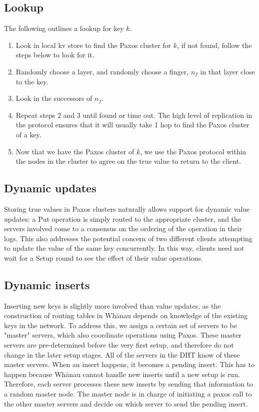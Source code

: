\documentclass[letter]{article}
\begin{document}
\subsection{Lookup}
The following outlines a lookup for key $k$.
\begin{enumerate}
\item Look in local kv store to find the Paxos cluster for $k$, if not found, follow the steps below to look for it.
\item Randomly choose a layer, and randomly choose a finger, $n_{f}$ in that layer close to the key.
\item Look in the successors of $n_{f}$.
\item Repeat steps 2 and 3 until found or time out. The high level of replication in the protocol ensures that it will usually take 1 hop to find the Paxos cluster of a key.
\item Now that we have the Paxos cluster of $k$, we use the Paxos protocol within the nodes in the cluster to agree on the true value to return to the client.


\end{enumerate}

\subsection{Dynamic updates}

Storing true values in Paxos clusters naturally allows support for dynamic value
updates: a Put operation is simply routed to the appropriate cluster, and the
servers involved come to a consensus on the ordering of the operation in their
logs. This also addresses the potential concern of two different clients
attempting to update the value of the same key concurrently. In this way,
clients need not wait for a Setup round to see the effect of their value
operations.

\subsection{Dynamic inserts}

Inserting new keys is slightly more involved than value updates, as the
construction of routing tables in Wh\={a}nau depends on knowledge of the existing
keys in the network. To address this, we assign a certain set of servers to be
"master" servers, which also coordinate operations using Paxos. These master servers
are pre-determined before the very first setup, and therefore do not change in the
later setup stages. All of the servers in the DHT know of these master servers. When
an insert happens, it becomes a pending insert. This has to happen because Wh\={a}nau
cannot handle new inserts until a new setup is run. Therefore, each server processes
these new inserts by sending that information to a random master node. The master
node is in charge of initiating a paxos call to the other master servers and decide
on which server to send the pending insert.
\end{document}
